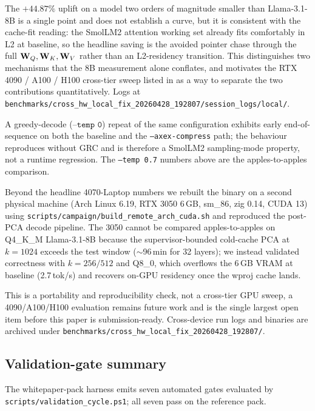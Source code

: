 \documentclass[11pt]{article}
\begin{document}
The $+44.87\%$ uplift on a model two orders of magnitude smaller than
Llama-3.1-8B is a single point and does not establish a curve, but it is
consistent with the cache-fit reading: the SmolLM2 attention working set
already fits comfortably in L2 at baseline, so the headline saving is
the avoided pointer chase through the full $\mathbf{W}_Q,\mathbf{W}_K,\mathbf{W}_V$
rather than an L2-residency transition. This distinguishes two
mechanisms that the 8B measurement alone conflates, and motivates the
RTX 4090 / A100 / H100 cross-tier sweep listed in
 as a way to separate the two contributions
quantitatively. Logs at
\texttt{benchmarks/cross\_hw\_local\_fix\_20260428\_192807/session\_logs/local/}.

A greedy-decode ($\texttt{--temp 0}$) repeat of the same configuration
exhibits early end-of-sequence on both the baseline and the
\texttt{--axex-compress} path; the behaviour reproduces without GRC and
is therefore a SmolLM2 sampling-mode property, not a runtime regression.
The \texttt{--temp 0.7} numbers above are the apples-to-apples
comparison.

\label{sec:second-device}

Beyond the headline 4070-Laptop numbers we rebuilt the binary on a
second physical machine (Arch Linux 6.19, RTX 3050 6\,GB, sm\_86, zig
0.14, CUDA 13) using \texttt{scripts/campaign/build\_remote\_arch\_cuda.sh}
and reproduced the post-PCA decode pipeline. The 3050 cannot be compared
apples-to-apples on Q4\_K\_M Llama-3.1-8B because the supervisor-bounded
cold-cache PCA at $k{=}1024$ exceeds the test window ($\sim$96\,min for 32
layers); we instead validated correctness with $k{=}256/512$ and Q8\_0,
which overflows the 6\,GB VRAM at baseline (2.7\,tok/s) and recovers
on-GPU residency once the wproj cache lands.

This is a portability and reproducibility check, not a cross-tier
GPU sweep, a 4090/A100/H100 evaluation remains future work and is the
single largest open item before this paper is submission-ready.
Cross-device run logs and binaries are archived under
\texttt{benchmarks/cross\_hw\_local\_fix\_20260428\_192807/}.

\subsection{Validation-gate summary}

The whitepaper-pack harness emits seven automated gates evaluated by
\texttt{scripts/validation\_cycle.ps1}; all seven pass on the reference pack.
\end{document}
